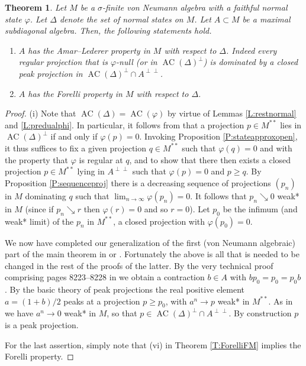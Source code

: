 \documentclass[10pt]{amsart}
\renewcommand{\phi}{\varphi}
\newcommand{\AC}{\operatorname{AC}}
\newtheorem{theorem}[lemma]{Theorem}
\theoremstyle{definition}
\begin{document}
\begin{theorem}  \label{T:ALstate}   
Let $M$ be a $\sigma$-finite von Neumann algebra with a faithful normal state $\phi$. Let $\Delta$ denote the set of normal states on $M$. Let $A\subset M$ be a maximal subdiagonal algebra. Then, the following statements hold.
\begin{enumerate}[{\rm (i)}]
\item $A$ has the  Amar--Lederer property in $M$ with respect to $\Delta$.  
Indeed every regular projection that is $\phi$-null (or in $\AC(\Delta)^\perp$) is dominated by a closed peak 
projection in $\AC(\Delta)^\perp\cap A^{\perp\perp}$. 
\item $A$ has the  Forelli property in $M$ with respect to $\Delta$.
\end{enumerate}
\end{theorem}
 \begin{proof}  
 (i) 
Note that $\AC(\Delta)=\AC(\phi)$ by virtue of Lemmas \ref{L:restnormal} and \ref{L:predualphi}. In particular, it follows from \cite[Lemma 2.4]{CT2023Henkin} that a projection $p\in M^{**}$  lies in $\AC(\Delta)^{\perp}$ if and only if $\phi(p)=0$. Invoking Proposition \ref{P:stateapproxopen}, it thus suffices to fix a given projection $q\in M^{**}$ such that $\phi(q)=0$ and with the property that $\phi$ is regular at $q$, and to show that there then exists a closed projection $p\in M^{**}$ lying in $A^{\perp\perp}$ such that $\phi(p)=0$ and $p\geq q$.   By Proposition \ref{P:sequenceproj}
 there is a decreasing sequence of projections $(p_n)$ in $M$ dominating $q$ such that $\lim_{n\to\infty}\phi(p_n)=0$.  It follows that $p_n \searrow 0$ weak* in $M$ (since 
 if $p_n \searrow r$ then $\phi(r) = 0$ and so $r = 0$).  Let $p_0$ be the 
 infimum (and weak* limit) of the $p_n$  in $M^{**}$, a closed projection with $\phi(p_0) = 0$.   
 
 We now have completed our generalization of the first (von Neumann algebraic) part of the main theorem in \cite{ueda2009} or \cite{BL2018}.   Fortunately 
the above is all that is needed to be changed in the rest of the proofs of the latter.  
By the very technical proof comprising pages 8223--8228 in \cite{BL2018} we obtain 
 a contraction  $b \in A$ with $b p_0 = p_0 = p_0 b$.   By the basic theory of peak projections \cite{hay2007,blecher2013} the real positive element 
  $a = (1+b)/2$ peaks at a projection $p \geq p_0$, with $a^n \to p$ weak* in $M^{**}$.
  As in \cite{ueda2009} we have $a^n \to 0$ weak* in $M$, so that $p \in \AC(\Delta)^\perp \cap A^{\perp\perp}$.  By construction $p$ is a peak projection. 

For the last assertion, simply note that (vi) in Theorem \ref{T:ForelliFM}  implies the  Forelli property.
\end{proof}
\end{document}
